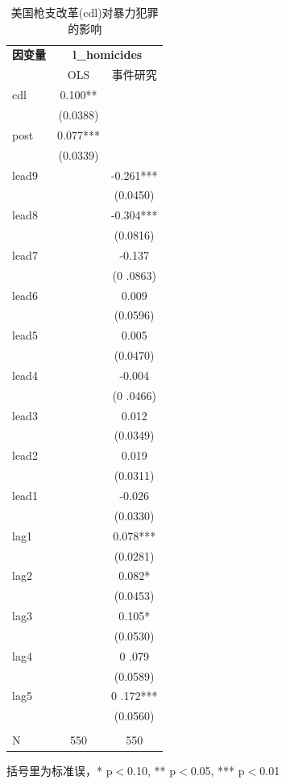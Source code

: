 \documentclass[cn,12pt,math=newtx,citestyle=gb7714-2015,bibstyle=gb7714-2015]{elegantbook}
\begin{document}
	\begin{table}[htbp]\centering
	\scriptsize
	\caption{美国枪支改革(cdl)对暴力犯罪的影响}
	\label{DID_1}
	\begin{center}
		\begin{threeparttable}
			\begin{tabular}{l*{2}{c}}
				\toprule
				\multicolumn{1}{l}{\textbf{因变量}}&
				\multicolumn{2}{c}{\textbf{l\_homicides}}\\
				\multicolumn{1}{c}{}&
				\multicolumn{1}{c}{OLS}&
				\multicolumn{1}{c}{事件研究}\\
				\midrule
				cdl                &       0.100**&      \\
				&    (0.0388)    &       \\
				post              &       0.077***&      \\
				&     (0.0339)  &      \\
				lead9& &-0.261*** \\
				&  & (0.0450) \\
				lead8 && -0.304***\\
				 && (0.0816)\\
				lead7 &&-0.137\\
				&&  (0 .0863)\\
				lead6 &&0.009 \\
				&&(0.0596)   \\
				lead5 &&0.005   \\
				&&(0.0470)   \\
				lead4 &&-0.004  \\
				&&(0 .0466)    \\
				lead3&&0.012  \\
				&&(0.0349)     \\
				lead2 && 0.019  \\
				&&(0.0311)    \\
				lead1 &&   -0.026  \\
				&& (0.0330)   \\
				lag1 && 0.078***  \\
				&& (0.0281)    \\
				lag2&&  0.082*  \\
				&& (0.0453)    \\
				lag3 &&  0.105* \\
				&& (0.0530)    \\
				lag4 && 0 .079  \\
				&& (0.0589)    \\
				lag5  && 0 .172*** \\
				&&(0.0560)\\
				
				\\
				\midrule
				N                   &       550   &       550   \\
				\bottomrule
			\end{tabular}
			\begin{tablenotes}
				\tiny
				\item 括号里为标准误，* p$<$0.10, ** p$<$0.05, *** p$<$0.01
			\end{tablenotes}
		\end{threeparttable}
	\end{center}
\end{table}
\end{document}
